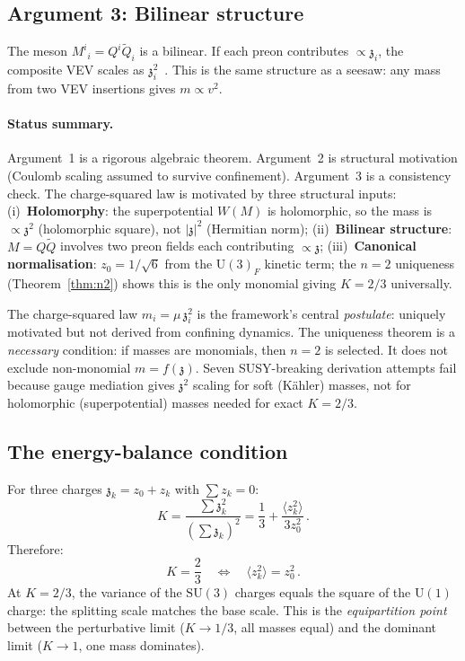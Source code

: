 \documentclass[aps,prd,twocolumn,showpacs,preprintnumbers,superscriptaddress,floatfix]{revtex4-2}
\newcommand{\SU}{\mathrm{SU}}
\newcommand{\UU}{\mathrm{U}}
\newcommand{\zch}{\mathfrak{z}}
\begin{document}
\subsection{Argument 3: Bilinear structure}

The meson $M^i{}_i = Q^i\tilde{Q}_i$ is a bilinear.
If each preon contributes $\propto \zch_i$, the composite VEV
scales as $\zch_i^2$~\cite{Koide:1990}.
This is the same structure as a seesaw: any mass from two VEV
insertions gives $m \propto v^2$.

\paragraph{Status summary.}
Argument~1 is a rigorous algebraic theorem.
Argument~2 is structural motivation (Coulomb scaling
assumed to survive confinement).
Argument~3 is a consistency check.
The charge-squared law is motivated by three structural inputs:
(i)~\textbf{Holomorphy}: the superpotential $W(M)$ is holomorphic,
so the mass is $\propto \zch^2$ (holomorphic square), not
$|\zch|^2$ (Hermitian norm);
(ii)~\textbf{Bilinear structure}: $M = Q\tilde{Q}$ involves two
preon fields each contributing $\propto \zch$;
(iii)~\textbf{Canonical normalisation}: $z_0 = 1/\sqrt{6}$
from the $\UU(3)_F$ kinetic term; the $n = 2$ uniqueness
(Theorem~\ref{thm:n2}) shows this is the only monomial giving
$K = 2/3$ universally.

The charge-squared law $m_i = \mu\,\zch_i^2$ is the framework's
central \emph{postulate}: uniquely motivated but not derived from
confining dynamics.
The uniqueness theorem is a \emph{necessary} condition: if masses
are monomials, then $n = 2$ is selected.
It does not exclude non-monomial $m = f(\zch)$.
Seven SUSY-breaking derivation attempts fail because gauge
mediation gives $\zch^2$ scaling for soft (K\"ahler) masses,
not for holomorphic (superpotential) masses needed for exact
$K = 2/3$.


\subsection{The energy-balance condition}

For three charges $\zch_k = z_0 + z_k$ with $\sum z_k = 0$:
\begin{equation}
  K = \frac{\sum \zch_k^2}{(\sum \zch_k)^2}
  = \frac{1}{3} + \frac{\langle z_k^2\rangle}{3z_0^2}\,.
  \label{eq:K_derivation}
\end{equation}
Therefore:
\begin{equation}
  \boxed{K = \frac{2}{3}
  \quad\Longleftrightarrow\quad
  \langle z_k^2\rangle = z_0^2\,.}
  \label{eq:energy_balance}
\end{equation}
At $K = 2/3$, the variance of the $\SU(3)$ charges equals the
square of the $\UU(1)$ charge: the splitting scale matches the
base scale.
This is the \emph{equipartition point} between the perturbative
limit ($K \to 1/3$, all masses equal) and the dominant limit
($K \to 1$, one mass dominates).
\end{document}
